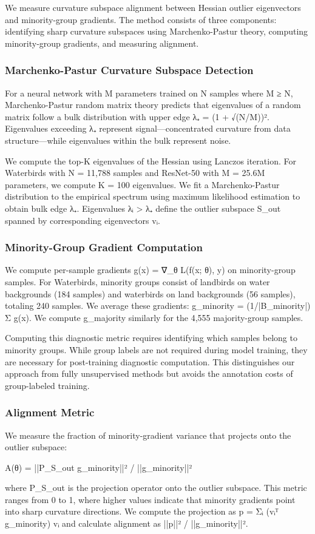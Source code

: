 
We measure curvature subspace alignment between Hessian outlier eigenvectors and minority-group gradients. The method consists of three components: identifying sharp curvature subspaces using Marchenko-Pastur theory, computing minority-group gradients, and measuring alignment.

\subsubsection{Marchenko-Pastur Curvature Subspace Detection}

For a neural network with M parameters trained on N samples where M ≥ N, Marchenko-Pastur random matrix theory predicts that eigenvalues of a random matrix follow a bulk distribution with upper edge λ₊ = (1 + √(N/M))². Eigenvalues exceeding λ₊ represent signal—concentrated curvature from data structure—while eigenvalues within the bulk represent noise.

We compute the top-K eigenvalues of the Hessian using Lanczos iteration. For Waterbirds with N = 11,788 samples and ResNet-50 with M = 25.6M parameters, we compute K = 100 eigenvalues. We fit a Marchenko-Pastur distribution to the empirical spectrum using maximum likelihood estimation to obtain bulk edge λ₊. Eigenvalues λᵢ > λ₊ define the outlier subspace S_out spanned by corresponding eigenvectors vᵢ.

\subsubsection{Minority-Group Gradient Computation}

We compute per-sample gradients g(x) = ∇_θ L(f(x; θ), y) on minority-group samples. For Waterbirds, minority groups consist of landbirds on water backgrounds (184 samples) and waterbirds on land backgrounds (56 samples), totaling 240 samples. We average these gradients: g_minority = (1/|B_minority|) Σ g(x). We compute g_majority similarly for the 4,555 majority-group samples.

Computing this diagnostic metric requires identifying which samples belong to minority groups. While group labels are not required during model training, they are necessary for post-training diagnostic computation. This distinguishes our approach from fully unsupervised methods but avoids the annotation costs of group-labeled training.

\subsubsection{Alignment Metric}

We measure the fraction of minority-gradient variance that projects onto the outlier subspace:

A(θ) = ||P_{S_out} g_minority||² / ||g_minority||²

where P_{S_out} is the projection operator onto the outlier subspace. This metric ranges from 0 to 1, where higher values indicate that minority gradients point into sharp curvature directions. We compute the projection as p = Σᵢ (vᵢᵀ g_minority) vᵢ and calculate alignment as ||p||² / ||g_minority||².
